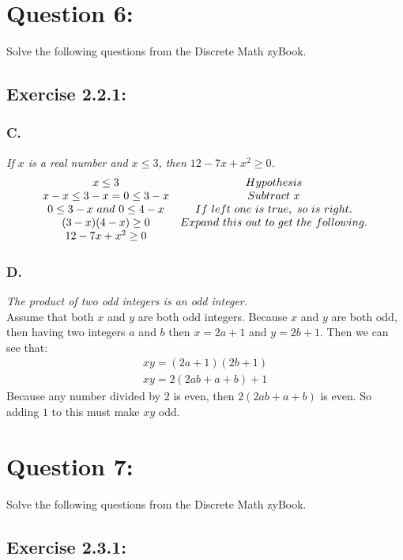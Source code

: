 \documentclass[titlepage]{article}\pagestyle{empty}
\begin{document}
\pagebreak
\section*{Question 6:}
Solve the following questions from the Discrete Math zyBook.
\subsection*{Exercise 2.2.1:}
\subsubsection*{C.}
\textit{If $x$ is a real number and $x \le 3$, then $12 - 7x + x^2 \geq 0$.}
\begin{displaymath}
\begin{array}{c c}
x \le 3 & Hypothesis\\
x - x \le 3 - x = 0 \le 3 - x & Subtract\ x\\
0 \le 3 -x\ and\ 0 \le 4 - x & If\ left\ one\ is\ true,\ so\ is\ right.\\
(3 - x)(4 - x)\ge 0 & Expand\ this\ out\ to\ get\ the\ following.\\
12 - 7x + x^2 \geq 0 &\\
\end{array}
\end{displaymath}
\subsubsection*{D.}
\textit{The product of two odd integers is an odd integer.}\\
Assume that both $x$ and $y$ are both odd integers. Because $x$ and $y$ are both odd, then having two integers $a$ and $b$ then $x = 2a + 1$ and $y = 2b + 1$. Then we can see that:
\begin{displaymath}
\begin{array}{c}
xy = (2a + 1)(2b + 1)\\
xy = 2(2ab + a + b) + 1
\end{array}
\end{displaymath}
Because any number divided by $2$ is even, then $2(2ab + a + b)$ is even. So adding $1$ to this must make $xy$ odd.

\pagebreak
\section*{Question 7:}
Solve the following questions from the Discrete Math zyBook.
\subsection*{Exercise 2.3.1:}
\end{document}
